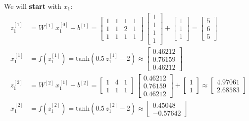 \documentclass[12pt]{article}
\begin{document}
\begin{enumerate}[leftmargin=\labelsep]
          We will \textbf{start} with $x_1$:
            \begingroup
            \allowdisplaybreaks
            \begin{align*}
                z^{[1]}_1 &= {W}^{[1]} \, {x}^{[0]}_1 + {b}^{[1]} = \begin{bmatrix} 1 & 1 & 1 & 1 \\ 1 & 1 & 2 & 1 \\ 1 & 1 & 1 & 1\end{bmatrix} \,  \begin{bmatrix} 1 \\ 1 \\ 1 \\ 1 \end{bmatrix} +
                \begin{bmatrix} 1 \\ 1 \\ 1\end{bmatrix} = \begin{bmatrix} 5 \\ 6 \\ 5\end{bmatrix} \\
                    {x}^{[1]}_1 &= f\left({z}^{[1]}_1\right) = \text{tanh}\left(0.5\,{z}^{[1]}_1 - 2\right) \approx \begin{bmatrix} 0.46212 \\ 0.76159 \\ 0.46212\end{bmatrix} \\
                z^{[2]}_1 &= {W}^{[2]} \, {x}^{[1]}_1 + {b}^{[2]} = \begin{bmatrix} 1 & 4 & 1 \\ 1 & 1 & 1\end{bmatrix} \, \begin{bmatrix} 0.46212 \\ 0.76159 \\ 0.46212 \end{bmatrix} +
                \begin{bmatrix} 1 \\ 1\end{bmatrix} \approx \begin{bmatrix} 4.97061 \\ 2.68583\end{bmatrix} \\
                {x}^{[2]}_1 &= f\left({z}^{[2]}_1\right) = \text{tanh}\left(0.5\,{z}^{[2]}_1 - 2\right) \approx \begin{bmatrix} 0.45048 \\ -0.57642\end{bmatrix} \\

\end{align*}
\end{enumerate}
\end{document}
